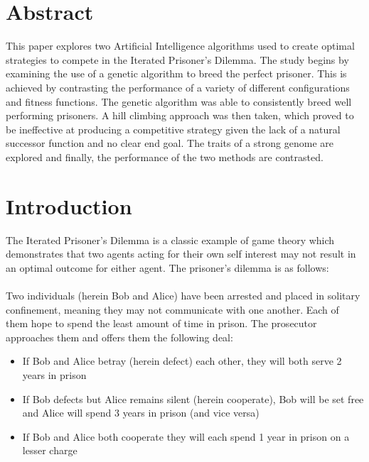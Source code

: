\documentclass[12pt]{article}
\begin{document}
\maketitle

\pagebreak
\tableofcontents
\pagebreak

\section{Abstract}

This paper explores two Artificial Intelligence algorithms used
to create optimal strategies to compete in the Iterated Prisoner's Dilemma. The
study begins by examining the use of a genetic algorithm to breed the perfect
prisoner. This is achieved by contrasting the performance of a variety of different configurations and fitness functions.  The genetic algorithm was able to
consistently breed well performing prisoners.
A hill climbing approach was then taken, which proved to be ineffective at producing a competitive strategy given the
lack of a natural successor function and no clear end goal.  The traits
of a strong genome are explored and finally, the performance of the two methods are contrasted.

\pagebreak

\section{Introduction}
The Iterated Prisoner's Dilemma is a classic example of game theory which demonstrates
that two agents acting for their own self interest may not result in an
optimal outcome for either agent.  The prisoner's
dilemma is as follows: \\ \\
Two individuals (herein Bob and Alice) have been arrested and placed in solitary
confinement, meaning they may not communicate with one another.  Each of them hope
to spend the least amount of time in prison. The prosecutor approaches them
and offers them the following deal:
\begin{itemize}
    \item If Bob and Alice betray (herein defect) each other, they will
        both serve 2 years in prison
    \item If Bob defects but Alice remains silent (herein cooperate), Bob
        will be set free and Alice will spend 3 years in prison (and vice versa)
    \item If Bob and Alice both cooperate they will each spend 1 year in prison
        on a lesser charge \\
\end{itemize}
\end{document}
